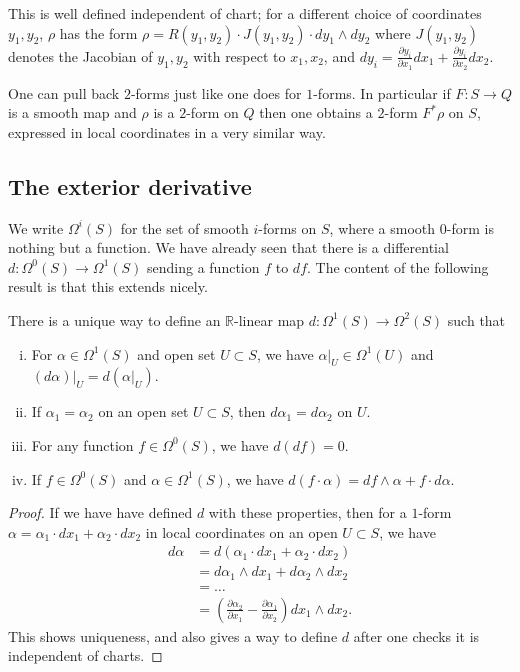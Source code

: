 This is well defined independent of chart; for a different choice of coordinates
\(y_1,y_2\), \(\rho\) has the form \( \rho=R(y_1,y_2)\cdot J(y_1,y_2) \cdot
dy_1\wedge dy_2 \) where \(J(y_1,y_2)\) denotes the Jacobian of \(y_1,y_2\) with
respect to \(x_1,x_2\), and \(dy_i=\frac{\partial y_i}{\partial x_1}dx_1 +
\frac{\partial y_i}{\partial x_2}dx_2\).

One can pull back \(2\)-forms just like one does for \(1\)-forms. In particular
if \(F:S\to Q\) is a smooth map and \(\rho\) is a \(2\)-form on \(Q\) then one
obtains a \(2\)-form \(F^\ast \rho\) on \(S\), expressed in local coordinates in
a very similar way.

\subsection{The exterior derivative} We write \(\Omega^i(S)\) for the set of smooth \(i\)-forms on \(S\), where a
smooth \(0\)-form is nothing but a function. We have already seen that there is
a differential \(d:\Omega^0(S)\to \Omega^1(S)\) sending a function \(f\) to
\(df\). The content of the following result is that this extends nicely.

\begin{lemma}
    There is a unique way to define an \(\mathbb{R}\)-linear map
    \(d:\Omega^1(S)\to \Omega^2(S)\) such that
    \begin{enumerate}[(i)]
        \item For \(\alpha\in \Omega^1(S)\) and open set \(U\subset S\), we have
        \(\alpha|_U\in \Omega^1(U)\) and \((d\alpha)|_U=d(\alpha|_U)\).
        \item If \(\alpha_1=\alpha_2\) on an open set \(U\subset S\), then
        \(d\alpha_1=d\alpha_2\) on \(U\).
        \item For any function \(f\in \Omega^0(S)\), we have \(d(df)=0\).
        \item If \(f\in \Omega^0(S)\) and \(\alpha\in \Omega^1(S)\), we have
        \(d(f\cdot \alpha)=df\wedge \alpha + f\cdot d\alpha\).
    \end{enumerate}

    \begin{proof}
        If we have have defined \(d\) with these properties, then for a
        \(1\)-form \(\alpha=\alpha_1\cdot dx_1+\alpha_2\cdot dx_2\) in local
        coordinates on an open \(U\subset S\), we have
        \begin{align*}
            d\alpha &= d(\alpha_1\cdot dx_1 +\alpha_2 \cdot dx_2) \\
                    &= d\alpha_1 \wedge dx_1 + d\alpha_2 \wedge dx_2 \\
                    &= \ldots \\
                    &= \left(\frac{\partial \alpha_2}{\partial x_1} -
                    \frac{\partial \alpha_1}{\partial x_2}\right) dx_1\wedge
                    dx_2.
        \end{align*}
        This shows uniqueness, and also gives a way to define \(d\) after one
        checks it is independent of charts.
    \end{proof}
\end{lemma}

